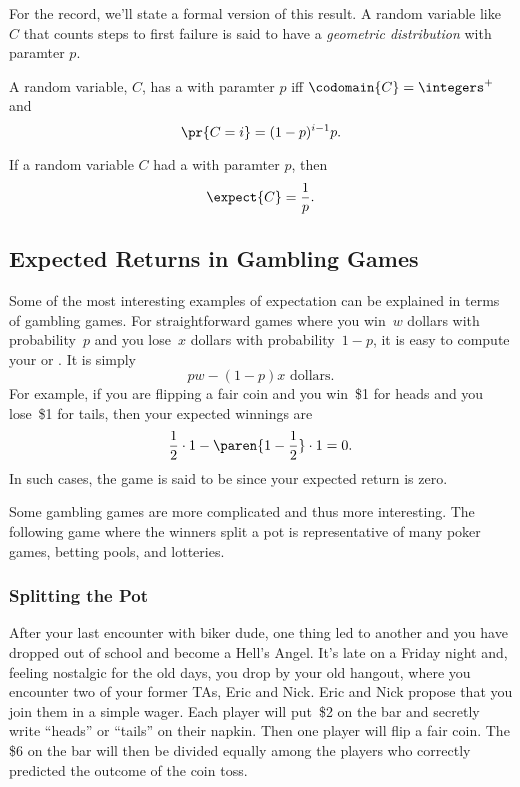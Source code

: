 For the record, we'll state a formal version of this result.  A random
variable like $C$ that counts steps to first failure is said to have a
\emph{geometric distribution} with paramter $p$.
\begin{definition}\label{def:geometric_distribution}
A random variable, $C$, has a  with
paramter $p$ iff $\codomain{C} = \integers^+$ and
\[
\pr{C=i} = (1-p)^{i-1}p.
\]
\end{definition}

\begin{lemma}\label{lem:exp_time_to_fail}
If a random variable $C$ had a  with
paramter $p$, then
\begin{equation}\label{exp_time_to_fail}
    \expect{C} = \frac{1}{p}.
\end{equation}
\end{lemma}


\subsection{Expected Returns in Gambling Games}

Some of the most interesting examples of expectation can be explained
in terms of gambling games.  For straightforward games where you
win~$w$ dollars with probability~$p$ and you lose~$x$ dollars with
probability~$1 - p$, it is easy to compute your 
or .  It is simply
\[
    p w - (1 - p) x \text{ dollars}.
\]
For example, if you are flipping a fair coin and you win~\$1 for heads
and you lose~\$1 for tails, then your expected winnings are
\[
    \frac{1}{2} \cdot 1 - \paren{1 - \frac{1}{2}} \cdot 1 = 0.
\]
In such cases, the game is said to be  since your expected
return is zero.

Some gambling games are more complicated and thus more interesting.
The following game where the winners split a pot is representative of
many poker games, betting pools, and lotteries.

\subsubsection{Splitting the Pot}

After your last encounter with biker dude, one thing led to another
and you have dropped out of school and become a Hell's Angel.  It's
late on a Friday night and, feeling nostalgic for the old days, you
drop by your old hangout, where you encounter two of your former TAs,
Eric and Nick.  Eric and Nick propose that you join them in a simple
wager. Each player will put~\$2 on the bar and secretly write
``heads'' or ``tails'' on their napkin.  Then one player will flip a
fair coin.   The \$6 on the bar will then be divided
equally among the players who correctly predicted the outcome of the
coin toss.

